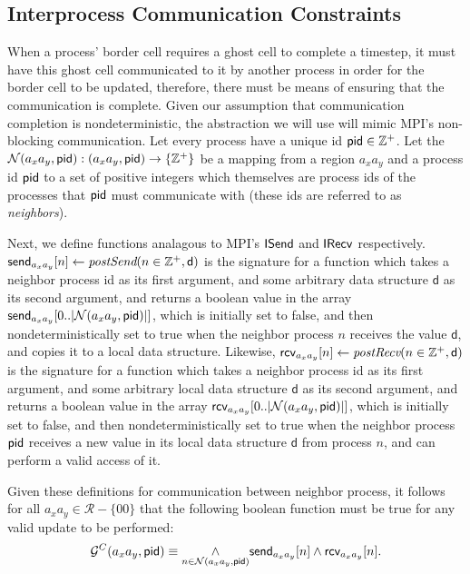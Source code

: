 \subsection{Interprocess Communication Constraints}

When a process' border cell requires a ghost cell to complete a timestep, it must have
this ghost cell communicated to it by another process in order for the border
cell to be updated, therefore, there must be means of ensuring that the communication
is complete.
Given our assumption that communication completion is nondeterministic, the abstraction
we will use will mimic MPI's non-blocking communication.  Let
every process have a unique id $\textup{\textsf{pid}} \in \mathbb{Z}^+$.  Let
the $\mathcal{N}(a_xa_y,\textup{\textsf{pid}}): (a_xa_y,\textup{\textsf{pid}}) \rightarrow \{\mathbb{Z}^+\}$ be a mapping
from a region $a_xa_y$ and a process id $\textup{\textsf{pid}}$ to a set of positive
integers which themselves are process ids of the processes that
$\textup{\textsf{pid}}$ must communicate with (these ids are referred to as {\it neighbors}).

Next, we define functions analagous to MPI's
$\textsf{\textup{ISend}}$ and $\textsf{\textup{IRecv}}$ respectively.
$\textsf{send}_{a_xa_y}[n] \leftarrow \textit{postSend}(n\in\mathbb{Z}^+,\textsf{d})$ is the signature for
a function which takes a neighbor process id as its first argument, and some
arbitrary data structure $\textsf{d}$ as its second argument, and returns a boolean value
in the array $\textsf{send}_{a_xa_y}[0..|\mathcal{N}(a_xa_y,\textup{\textsf{pid}})|]$,
 which is initially set to false, and then
nondeterministically set to true when the neighbor process $n$ receives
the value $\textsf{d}$, and copies it to a local data structure.  Likewise,
$\textsf{rcv}_{a_xa_y}[n] \leftarrow \textit{postRecv}(n\in\mathbb{Z}^+,\textsf{d})$ is the signature for
a function which takes a neighbor process id as its first argument, and some
arbitrary local data structure $\textsf{d}$ as its second argument,
and returns a boolean value
in the array $\textsf{rcv}_{a_xa_y}[0..|\mathcal{N}(a_xa_y,\textup{\textsf{pid}})|]$,
 which is initially set to false, and then
nondeterministically set to true when the neighbor process
$\textup{\textsf{pid}}$ receives a new value in its local data structure $\textsf{d}$
from process $n$, and can perform a valid access of it.

Given these definitions for communication between neighbor process, it follows
for all $a_xa_y\in\mathcal{R} - \{00\}$ that the following boolean function
must be true for any valid update to be performed:
\begin{equation}
    \mathcal{G}^C(a_xa_y,\textup{\textsf{pid}}) \equiv \underset{n \in \mathcal{N}(a_xa_y,\textup{\textsf{pid}})}{\wedge}
    \textsf{send}_{a_xa_y}[n] \wedge \textsf{rcv}_{a_xa_y}[n].
    \label{eq:comm_guard}
\end{equation}


